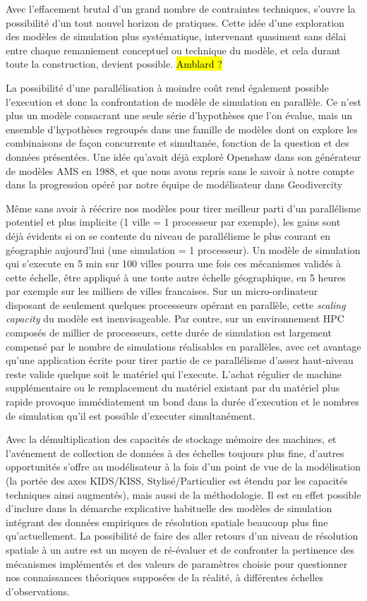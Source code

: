 Avec l'effacement brutal d'un grand nombre de contraintes techniques, s'ouvre la possibilité d'un tout nouvel horizon de pratiques. Cette idée d'une exploration des modèles de simulation plus systématique, intervenant quasiment sans délai entre chaque remaniement conceptuel ou technique du modèle, et cela durant toute la construction, devient possible. \hl{Amblard ?}

La possibilité d'une parallélisation à moindre coût rend également possible l'execution et donc la confrontation de modèle de simulation en parallèle. Ce n'est plus un modèle consacrant une seule série d'hypothèses que l'on évalue, mais un ensemble d'hypothèses regroupés dans une famille de modèles dont on explore les combinaisons de façon concurrente et simultanée, fonction de la question et des données présentées. Une idée qu'avait déjà exploré Openshaw dans son générateur de modèles AMS en 1988, et que nous avons repris sans le savoir à notre compte dans la progression opéré par notre équipe de modélisateur dans Geodivercity \autocite{Cottineau2014b}

Même sans avoir à réécrire nos modèles pour tirer meilleur parti d'un parallélisme potentiel et plus implicite (1 ville = 1 processeur par exemple), les gains sont déjà évidents si on se contente du niveau de parallélisme le plus courant en géographie aujourd'hui (une simulation = 1 processeur). Un modèle de simulation qui s’execute en 5 min sur 100 villes pourra une fois ces mécanismes validés à cette échelle, être appliqué à une toute autre échelle géographique, en 5 heures par exemple sur les milliers de villes francaises. Sur un micro-ordinateur disposant de seulement quelques processeurs opérant en parallèle, cette \textit{scaling capacity} du modèle est inenvisageable. Par contre, sur un environnement HPC composés de millier de processeurs, cette durée de simulation est largement compensé par le nombre de simulations réalisables en parallèles, avec cet avantage qu'une application écrite pour tirer partie de ce parallélisme d'assez haut-niveau reste valide quelque soit le matériel qui l'execute. L'achat régulier de machine supplémentaire ou le remplacement du matériel existant par du matériel plus rapide provoque immédiatement un bond dans la durée d'execution et le nombres de simulation qu'il est possible d'executer simultanément.

Avec la démultiplication des capacités de stockage mémoire des machines, et l'avénement de collection de données à des échelles toujours plus fine, d'autres opportunités s'offre au modélisateur à la fois d'un point de vue de la modélisation (la portée des axes KIDS/KISS, Stylisé/Particulier \autocite{Banos2013a} est étendu par les capacités techniques ainsi augmentés), mais aussi de la méthodologie. Il est en effet possible d'inclure dans la démarche explicative habituelle des modèles de simulation intégrant des données empiriques de résolution spatiale beaucoup plus fine qu'actuellement. La possibilité de faire des aller retours d'un niveau de résolution spatiale à un autre est un moyen de ré-évaluer et de confronter la pertinence des mécanismes implémentés et des valeurs de paramètres choisie pour questionner nos connaissances théoriques supposées de la réalité, à différentes échelles d'observations. 

